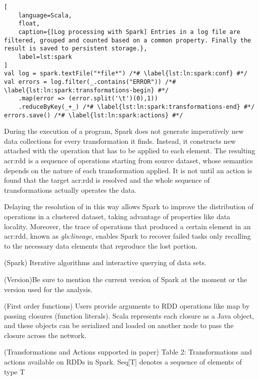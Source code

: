 \begin{lstlisting}[
	language=Scala,
	float,
	caption={[Log processing with Spark] Entries in a log file are filtered, grouped and counted based on a common property. Finally the result is saved to persistent storage.},
	label=lst:spark
]
val log = spark.textFile("*file*") /*# \label{lst:ln:spark:conf} #*/
val errors = log.filter(_.contains("ERROR")) /*# \label{lst:ln:spark:transformations-begin} #*/
	.map(error => (error.split('\t')(0),1))
	.reduceByKey(_+_) /*# \label{lst:ln:spark:transformations-end} #*/
errors.save() /*# \label{lst:ln:spark:actions} #*/
\end{lstlisting}

During the execution of a program, Spark does not generate imperatively new data collections for every transformation it finds. Instead, it constructs new  attached with the operation that has to be applied to each element. The resulting \acrshort{acr:rdd} is a sequence of operations starting from source dataset, whose semantics depends on the nature of each transformation applied. It is not until an action is found that the target \acrshort{acr:rdd} is resolved and the whole sequence of transformations actually operates the data. 

Delaying the resolution of  in this way allows Spark to improve the distribution of operations in a clustered dataset, taking advantage of properties like data locality. Moreover, the trace of operations that produced a certain element in an \acrshort{acr:rdd}, known as \textit{\gls{gls:lineage}}, enables Spark to recover failed tasks only recalling to the necessary data elements that reproduce the lost portion. 


(Spark) Iterative algorithms and interactive querying of data sets.

(Version)Be sure to mention the current version of Spark at the moment or the version used for the analysis.


(First order functions) Users provide arguments to RDD operations like map by passing closures (function literals). Scala represents each closure as a Java object, and these objects can be serialized and loaded on another node to pass the closure across the network. \cite{Zaharia2012a}

(Transformations and Actions supported in paper) Table 2: Transformations and actions available on RDDs in Spark. Seq[T] denotes a sequence of elements of type T \cite{Zaharia2012a}


